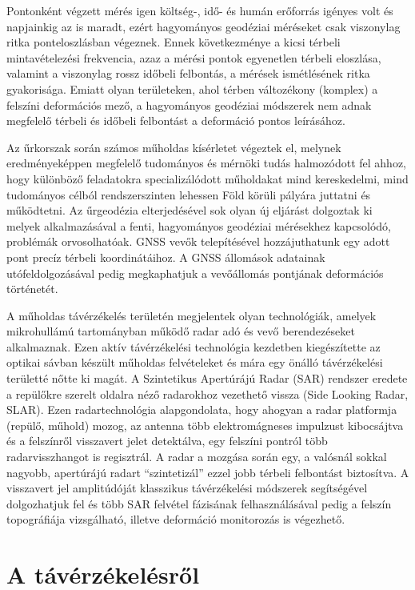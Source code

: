 \documentclass[12pt]{report}
\numberwithin{equation}{section}
\numberwithin{table}{section}
\numberwithin{figure}{section}
\begin{document}
Pontonként végzett mérés igen költség-, idő- és humán erőforrás igényes volt és napjainkig az is maradt, ezért hagyományos geodéziai méréseket csak viszonylag ritka ponteloszlásban végeznek. Ennek következménye a kicsi térbeli mintavételezési frekvencia, azaz a mérési pontok egyenetlen térbeli eloszlása, valamint a viszonylag rossz időbeli felbontás, a mérések ismétlésének ritka gyakorisága. Emiatt olyan területeken, ahol térben változékony (komplex) a felszíni deformációs mező, a hagyományos geodéziai módszerek nem adnak megfelelő térbeli és időbeli felbontást a deformáció pontos leírásához.

Az űrkorszak során számos műholdas kísérletet végeztek el, melynek eredményeképpen megfelelő tudományos és mérnöki tudás halmozódott fel ahhoz, hogy különböző feladatokra specializálódott műholdakat mind kereskedelmi, mind tudományos célból rendszerszinten lehessen Föld körüli pályára juttatni és működtetni. Az űrgeodézia elterjedésével sok olyan új eljárást dolgoztak ki melyek alkalmazásával a fenti, hagyományos geodéziai mérésekhez kapcsolódó, problémák orvosolhatóak. GNSS vevők telepítésével hozzájuthatunk egy adott pont precíz térbeli koordinátáihoz. A GNSS állomások adatainak utófeldolgozásával pedig megkaphatjuk a vevőállomás pontjának deformációs történetét.

A műholdas távérzékelés területén megjelentek olyan technológiák, amelyek mikrohullámú tartományban működő radar adó és vevő berendezéseket alkalmaznak. Ezen aktív távérzékelési technológia kezdetben kiegészítette az optikai sávban készült műholdas felvételeket és mára egy önálló távérzékelési területté nőtte ki magát. A Szintetikus Apertúrájú Radar (SAR) rendszer eredete a repülőkre szerelt oldalra néző radarokhoz vezethető vissza (Side Looking Radar, SLAR). Ezen radartechnológia alapgondolata, hogy ahogyan a radar platformja (repülő, műhold) mozog, az antenna több elektromágneses impulzust kibocsájtva és a felszínről visszavert jelet detektálva, egy felszíni pontról több radarvisszhangot is regisztrál. A radar a mozgása során egy, a valósnál sokkal nagyobb, apertúrájú radart ``szintetizál'' ezzel jobb térbeli felbontást biztosítva. A visszavert jel amplitúdóját klasszikus távérzékelési módszerek segítségével dolgozhatjuk fel és több SAR felvétel fázisának felhasználásával pedig a felszín topográfiája vizsgálható, illetve deformáció monitorozás is végezhető.

\section{A távérzékelésről}
\end{document}
